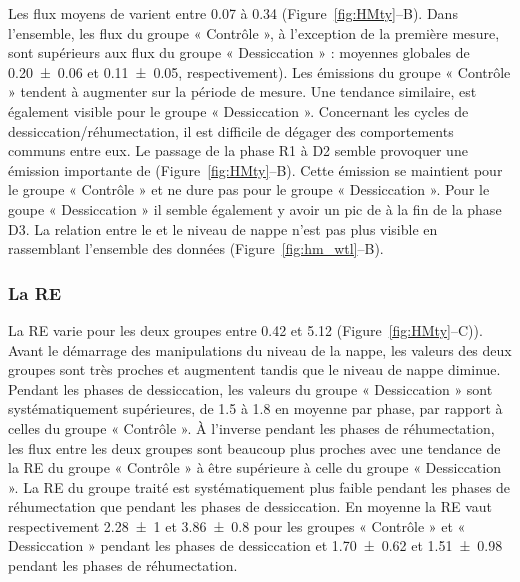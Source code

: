 Les flux moyens de \chh varient entre \num{0.07} à \SI{0.34}{\uml} (Figure~\ref{fig:HMty}--B).
Dans l'ensemble, les flux du groupe « Contrôle », à l'exception de la première mesure, sont supérieurs aux flux du groupe « Dessiccation » : moyennes globales de \num{0.20(006)} et \SI{0.11(005)}{\uml}, respectivement).
Les émissions du groupe « Contrôle » tendent à augmenter sur la période de mesure.
Une tendance similaire, est également visible pour le groupe « Dessiccation ».
Concernant les cycles de dessiccation/réhumectation, il est difficile de dégager des comportements communs entre eux.
Le passage de la phase R1 à D2 semble provoquer une émission importante de \chh  (Figure~\ref{fig:HMty}--B).
Cette émission se maintient pour le groupe « Contrôle » et ne dure pas pour le groupe « Dessiccation ».
Pour le goupe « Dessiccation » il semble également y avoir un pic de \chh à la fin de la phase D3.
La relation entre le \chh et le niveau de nappe n'est pas plus visible en rassemblant l'ensemble des données (Figure~\ref{fig:hm_wtl}--B).

\subsubsection{La RE}

La RE varie pour les deux groupes entre \num{0.42} et \SI{5.12}{\uml} (Figure~\ref{fig:HMty}--C)).
Avant le démarrage des manipulations du niveau de la nappe, les valeurs des deux groupes sont très proches et augmentent tandis que le niveau de nappe diminue.
Pendant les phases de dessiccation, les valeurs du groupe « Dessiccation » sont systématiquement supérieures, de \num{1.5} à \SI{1.8}{\uml} en moyenne par phase, par rapport à celles du groupe « Contrôle ».
À l'inverse pendant les phases de réhumectation, les flux entre les deux groupes sont beaucoup plus proches avec une tendance de la RE du groupe « Contrôle » à être supérieure à celle du groupe « Dessiccation ».
La RE du groupe traité est systématiquement plus faible pendant les phases de réhumectation que pendant les phases de dessiccation.
En moyenne la RE vaut respectivement \num{2.28(100)} et \SI{3.86(080)}{\uml} pour les groupes « Contrôle » et « Dessiccation » pendant les phases de dessiccation et \num{1.70(062)} et \SI{1.51(098)}{\uml} pendant les phases de réhumectation.
